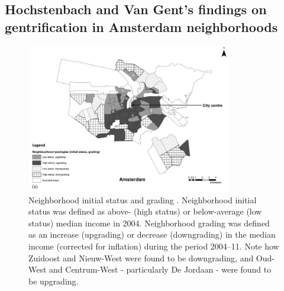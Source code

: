 \onecolumn

\appendix
\begin{appendices}

\section{Hochstenbach and Van Gent's findings on gentrification in Amsterdam neighborhoods}
\label{sec:apx:Hochstenbach}

    {\setlength{\intextsep}{0pt}
    \begin{figure}[h!]
        \centering
        \includegraphics[width=0.8\textwidth]{media/methodology/neighbourhood-grading.jpg}
        \caption{Neighborhood initial status and grading \cite{hochstenbach_anatomy_2015}. Neighborhood initial status was defined as above- (high status) or below-average (low status) median income in 2004. Neighborhood grading was defined as an increase (upgrading) or decrease (downgrading) in the median income (corrected for inflation) during the period 2004–11. Note how Zuidoost and Nieuw-West were found to be downgrading, and Oud-West and Centrum-West - particularly De Jordaan - were found to be upgrading.}
    \end{figure}
    
}
\end{appendices}

